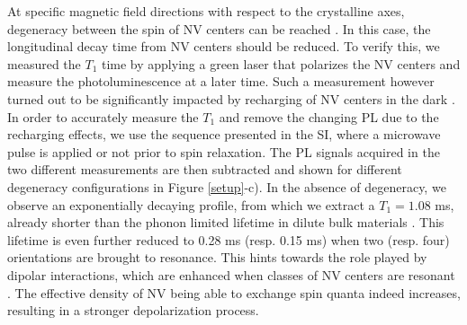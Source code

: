 \documentclass[preprintnumbers,amsmath,amssymb,superscriptaddress,twocolumn,showpacs]{revtex4-1}
\begin{document}
At specific magnetic field directions with respect to the crystalline axes, degeneracy between the spin of NV centers can be reached \cite{van_oort_cross-relaxation_1989}. %
In this case, the longitudinal decay time from NV centers should be reduced. To verify this, we measured the $T_1$ time by applying a green laser that polarizes the NV centers and measure the photoluminescence at a later time.
Such a measurement however turned out to be significantly impacted by recharging of NV centers in the dark \cite{choi_depolarization_2017, mrozek_longitudinal_2015, giri_selective_2019, giri_coupled_2018}.
In order to accurately measure the $T_1$ and remove the changing PL due to the recharging effects, we use the sequence presented in the SI, where a microwave pulse is applied or not prior to spin relaxation. The PL signals acquired in the two different measurements are then subtracted and shown for different degeneracy configurations in Figure \ref{setup}-c).
In the absence of degeneracy, we observe an exponentially decaying profile, from which we extract a $T_1=1.08$ ms, already shorter than the phonon limited lifetime in dilute bulk materials \cite{Tetienne}. This lifetime is even further reduced to 0.28 ms (resp. 0.15 ms) when two (resp. four) orientations are brought to resonance. This hints towards the role played by dipolar interactions, which are enhanced when classes of NV centers are resonant \cite{van_oort_cross-relaxation_1989, choi_depolarization_2017}. The effective density of NV being able to exchange spin quanta indeed increases, resulting in a stronger depolarization process.

\end{document}
